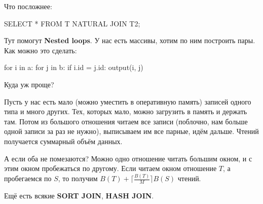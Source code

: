 Что посложнее:
\begin{sqlcode}
SELECT *
	FROM T
	NATURAL JOIN T2;
\end{sqlcode}
Тут помогут \textbf{Nested loops}.
У нас есть массивы, хотим по ним построить пары.
Как можно это сделать:
\begin{pythoncode}
for i in a:
	for j in b:
		if i.id = j.id:
			output(i, j)
\end{pythoncode}
Куда уж проще?

Пусть у нас есть мало (можно уместить в оперативную память) записей одного типа и много других.
Тех, которых мало, можно загрузить в память и держать там.
Потом из большого отношения читаем все записи (поблочно, нам больше одной записи за раз не нужно), выписываем им все парные, идём дальше.
Чтений получается суммарный объём данных.

А если оба не помезаются?
Можно одно отношение читать большим окном, и с этим окном пробежаться по другому.
Если читаем окном отношение $T$, а пробегаемся по $S$, то получим $B(T) + \lceil \frac{B(T)}M \rceil B(S)$ чтений.

Ещё есть всякие \textbf{SORT JOIN}, \textbf{HASH JOIN}.
